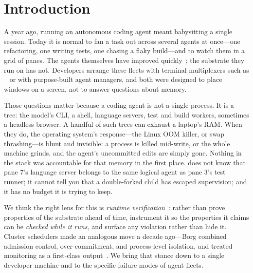 \section{Introduction}

A year ago, running an autonomous coding agent meant babysitting a single session. Today it is
normal to fan a task out across several agents at once---one refactoring, one writing tests, one
chasing a flaky build---and to watch them in a grid of panes. The agents themselves have improved
quickly~\citep{yao2023react,shinn2023reflexion,jimenez2024swebench,yang2024sweagent}; the substrate
they run on has not. Developers arrange these fleets with terminal multiplexers such as
~\citep{tmux} or with purpose-built agent managers, and both were designed to place
windows on a screen, not to answer questions about memory.

Those questions matter because a coding agent is not a single process. It is a tree: the model's
CLI, a shell, language servers, test and build workers, sometimes a headless browser. A handful of
such trees can exhaust a laptop's RAM. When they do, the operating system's response---the Linux OOM
killer, or swap thrashing---is blunt and invisible: a process is killed mid-write, or the whole
machine grinds, and the agent's uncommitted edits are simply gone. Nothing in the stack was
accountable for that memory in the first place.  does not know that pane 7's language
server belongs to the same logical agent as pane 3's test runner; it cannot tell you that a
double-forked child has escaped supervision; and it has no budget it is trying to keep.

We think the right lens for this is \emph{runtime verification}~\citep{bartocci2018introrv}: rather
than prove properties of the substrate ahead of time, instrument it so the properties it claims can
be \emph{checked while it runs}, and surface any violation rather than hide it. Cluster schedulers
made an analogous move a decade ago---Borg combined admission control, over-commitment, and
process-level isolation, and treated monitoring as a first-class output~\citep{verma2015borg}. We
bring that stance down to a single developer machine and to the specific failure modes of agent
fleets.

